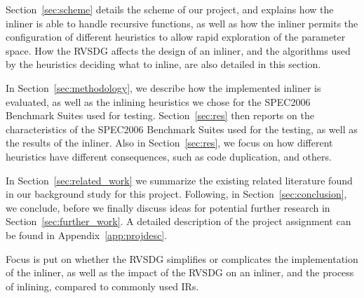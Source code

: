 Section~\ref{sec:scheme} details the scheme of our project, and explains how the
inliner is able to handle recursive functions, as well as how the inliner
permits the configuration of different heuristics to allow rapid exploration of
the parameter space. How the RVSDG affects the design of an inliner, and the
algorithms used by the heuristics deciding what to inline, are also detailed in
this section.

In Section~\ref{sec:methodology}, we describe how the implemented inliner is
evaluated, as well as the inlining heuristics we chose for the SPEC2006
Benchmark Suites used for testing. Section~\ref{sec:res} then reports on the
characteristics of the SPEC2006 Benchmark Suites used for the testing, as well
as the results of the inliner. Also in Section~\ref{sec:res}, we focus on how
different heuristics have different consequences, such as code duplication, and
others.

In Section~\ref{sec:related_work} we summarize the existing related literature
found in our background study for this project. Following, in
Section~\ref{sec:conclusion}, we conclude, before we finally discuss ideas for
potential further research in Section~\ref{sec:further_work}. A detailed
description of the project assignment can be found in
Appendix~\ref{app:projdesc}.


Focus is put on whether the RVSDG simplifies or complicates the implementation
of the inliner, as well as the impact of the RVSDG on an inliner, and the
process of inlining, compared to commonly used IRs.
